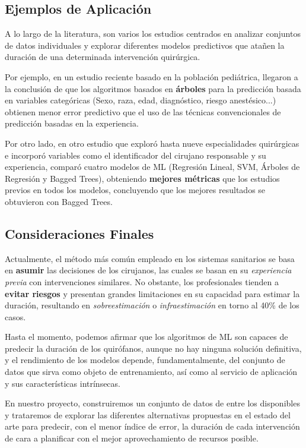 \subsection{Ejemplos de Aplicación}

A lo largo de la literatura, son varios los estudios centrados en analizar conjuntos de datos individuales y explorar diferentes modelos predictivos que atañen la duración de una determinada intervención quirúrgica.

Por ejemplo, en un estudio reciente \cite{Master2017ImprovingLearning} basado en la población pediátrica, llegaron a la conclusión de que los algoritmos basados en \textbf{árboles} para la predicción basada en variables categóricas (Sexo, raza, edad, diagnóstico, riesgo anestésico...) obtienen menor error predictivo que el uso de las técnicas convencionales de predicción basadas en la experiencia.

Por otro lado, en otro estudio que exploró hasta nueve especialidades quirúrgicas \cite{Martinez2021MachinePrediction} e incorporó variables como el identificador del cirujano responsable y su experiencia, comparó cuatro modelos de ML (Regresión Lineal, SVM, Árboles de Regresión y Bagged Trees), obteniendo \textbf{mejores métricas} que los estudios previos en todos los modelos, concluyendo que los mejores resultados se obtuvieron con Bagged Trees.

\subsection{Consideraciones Finales}

Actualmente, el método más común empleado en los sistemas sanitarios se basa en \textbf{asumir} las decisiones de los cirujanos, las cuales se basan en su \textit{experiencia previa} con intervenciones similares. No obstante, los profesionales tienden a \textbf{evitar riesgos} y presentan grandes limitaciones en su capacidad para estimar la duración, resultando en \textit{sobreestimación} o \textit{infraestimación} en torno al 40\% de los casos\cite{Huang2022AutomaticNetworks}.

Hasta el momento, podemos afirmar que los algoritmos de ML son capaces de predecir la duración de los quirófanos, aunque no hay ninguna solución definitiva, y el rendimiento de los modelos depende, fundamentalmente, del conjunto de datos que sirva como objeto de entrenamiento, así como al servicio de aplicación y sus características intrínsecas.

En nuestro proyecto, construiremos un conjunto de datos de entre los disponibles y trataremos de explorar las diferentes alternativas propuestas en el estado del arte para predecir, con el menor índice de error, la duración de cada intervención de cara a planificar con el mejor aprovechamiento de recursos posible.

